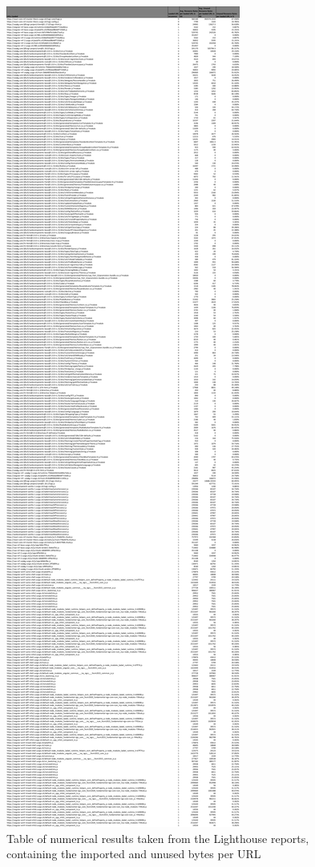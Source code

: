 \begin{figure}[!h]
	\centering
	\begin{adjustbox}{width=\textwidth,totalheight=0.7\textheight}
		\includegraphics[angle=90]{Figures/lighthouse_json_1.pdf}
	\end{adjustbox}
	\caption{Table of numerical results taken from the Lighthouse reports, containing the imported and unused bytes per URL}
	\label{fig:appendix_2_1}
\end{figure}

